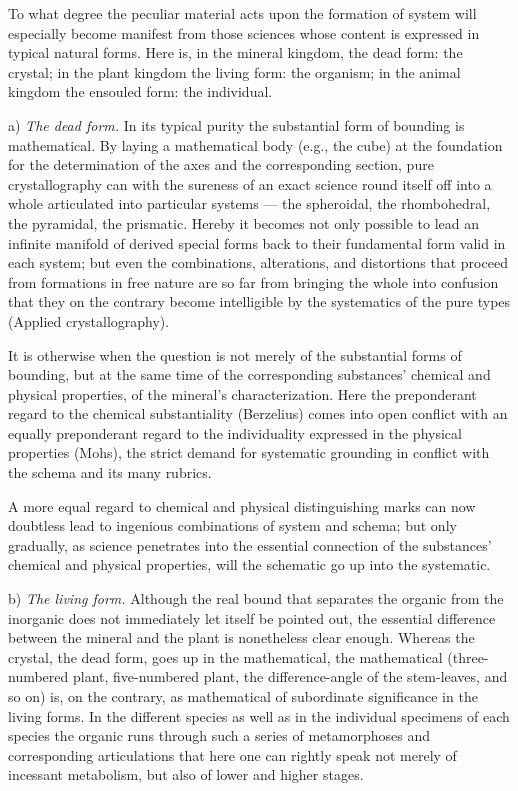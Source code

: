\documentclass[12pt]{book}
\begin{document}
To what degree the peculiar material acts upon the formation of system will especially become manifest from
those sciences whose content is expressed in typical natural forms. Here is, in the mineral kingdom, the dead
form: the crystal; in the plant kingdom the living form: the organism; in the animal kingdom the ensouled
form: the individual.

a) \emph{The dead form.} In its typical purity the substantial form of bounding is mathematical. By laying a
mathematical body (e.g., the cube) at the foundation for the determination of the axes and the corresponding
section, pure crystallography can with the sureness of an exact science round itself off into a whole
articulated into particular systems — the spheroidal, the rhombohedral, the pyramidal, the prismatic. Hereby
it becomes not only possible to lead an infinite manifold of derived special forms back to their fundamental
form valid in each system; but even the combinations, alterations, and distortions that proceed from formations
in free nature are so far from bringing the whole into confusion that they on the contrary become intelligible
by the systematics of the pure types (Applied crystallography).

It is otherwise when the question is not merely of the substantial forms of bounding, but at the same time of
the corresponding substances' chemical and physical properties, of the mineral's characterization. Here the
preponderant regard to the chemical substantiality (Berzelius) comes into open conflict with an equally
preponderant regard to the individuality expressed in the physical properties (Mohs), the strict demand for
systematic grounding in conflict with the schema and its many rubrics.

A more equal regard to chemical and physical distinguishing marks can now doubtless lead to ingenious
combinations of
system and schema; but only gradually, as science penetrates into the essential connection of the substances'
chemical and physical properties, will the schematic go up into the systematic.

b) \emph{The living form.} Although the real bound that separates the organic from the inorganic does not
immediately let itself be pointed out, the essential difference between the mineral and the plant is
nonetheless clear enough. Whereas the crystal, the dead form, goes up in the mathematical, the mathematical
(three-numbered plant, five-numbered plant, the difference-angle of the stem-leaves, and so on) is, on the
contrary, as mathematical of subordinate significance in the living forms. In the different species as well
as in the individual specimens of each species the organic runs through such a series of metamorphoses and
corresponding articulations that here one can rightly speak not merely of incessant metabolism, but also of
lower and higher stages.
\end{document}
